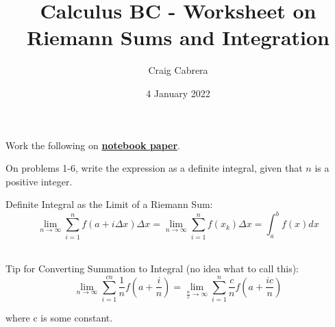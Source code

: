\documentclass[10pt, letterpaper]{report}
\title{Calculus BC - Worksheet on Riemann Sums and Integration}
\author{Craig Cabrera}
\date{4 January 2022}
\begin{document}
\maketitle
Work the following on \textbf{\underline{notebook paper}}.
\par On problems 1-6, write the expression as a definite integral, given that $n$ is a positive integer. \\

\par Definite Integral as the Limit of a Riemann Sum: \\

\[ \lim_{n\to\infty}\sum_{i=1}^{n}f(a+i\Delta x)\Delta x=\lim_{n\to\infty}\sum_{i=1}^{n}f(x_{k})\Delta x=\int_{a}^{b}f(x)dx \] \\

\par Tip for Converting Summation to Integral (no idea what to call this): \\

\[ \lim_{n\to\infty}\sum_{i=1}^{cn}\frac{1}{n}f(a+\frac{i}{n})=
\lim_{\frac{n}{c}\to\infty}\sum_{i=1}^{n}\frac{c}{n}f(a+\frac{ic}{n}) \]
\par where c is some constant. \\
\end{document}
